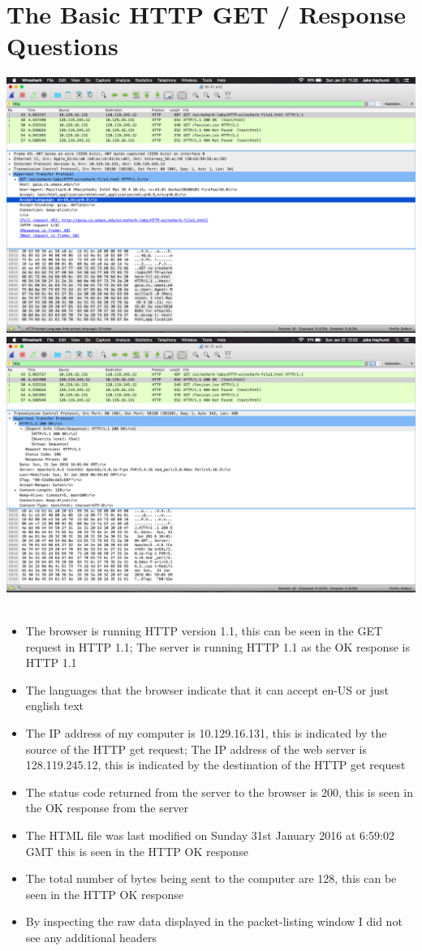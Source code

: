 \documentclass{article}
\begin{document}
\section {The Basic HTTP GET / Response Questions}
\includegraphics[width=\textwidth]{SimpleHTTPGet}\\
\includegraphics[width=\textwidth]{SimpleHTTPOk}\\\\
\begin{itemize}
  \item The browser is running HTTP version 1.1, this can be seen in the GET request in HTTP 1.1; The server is running HTTP 1.1 as the OK response is HTTP 1.1
  \item The languages that the browser indicate that it can accept en-US or just english text
  \item The IP address of my computer is 10.129.16.131, this is indicated by the source of the HTTP get request; The IP address of the web server is 128.119.245.12, this is indicated by the destination of the HTTP get request
  \item The status code returned from the server to the browser is 200, this is seen in the OK response from the server
  \item The HTML file was last modified on Sunday 31st January 2016 at 6:59:02 GMT this is seen in the HTTP OK response
  \item The total number of bytes being sent to the computer are 128, this can be seen in the HTTP OK response
  \item By inspecting the raw data displayed in the packet-listing window I did not see any additional headers
\end{itemize}
\end{document}
